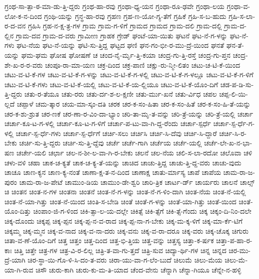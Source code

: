 {ಗ್ರಂಥ-ಸಾ-ತ್ಪಾ-ಠ-ಮಾ-ಡು-ತ್ತಿ-ದ್ದರು
ಗ್ರಂಥ-ಹಾ-ರವು
ಗ್ರಂಥಾ-ಧ್ಯ-ಯನ
ಗ್ರಂಥಾ-ರೂ-ಢವೇ
ಗ್ರಂಥಾ-ಲಯ
ಗ್ರಂಥಾ-ವ-ಲೋ-ಕ-ನ-ದಿಂದ
ಗ್ರಂಥಿ-ಯನ್ನು
ಗ್ರನ್ಥ-ಹಾ-ರವು
ಗ್ರಹಣ
ಗ್ರಹ-ಣ-ಯೋ-ಗ್ಯ-ತೆಗೆ
ಗ್ರಹಿಕೆ
ಗ್ರಹಿ-ಸ-ಬ-ಹುದು
ಗ್ರಹಿ-ಸ-ಲಾ-ರ-ದ-ವನ
ಗ್ರಹಿಸಿ
ಗ್ರಹ-ನ-ಕ್ಷ-ತ್ರ-ಗಳ
ಗ್ರಾಮ
ಗ್ರಾಮ-ಗ-ಳಿಗೆ
ಗ್ರಾಮದ
ಗ್ರಾಮದ
ಗ್ರಾಮ-ದಲಿ
ಗ್ರಾಮ-ದಲ್ಲಿ
ಗ್ರಾಮ-ದ-ಲ್ಲಿನ
ಗ್ರಾಮ-ದವ
ಗ್ರಾಮ-ದ-ವರು
ಗ್ರಾಮೀಣ
ಗ್ರಾಹಕ
ಗ್ರೇಡ್
ಘಂಟೆ-ಯಾ-ಯಿತು
ಘಟನೆ
ಘಟ-ನೆ-ಗ-ಳನ್ನು
ಘಟ-ನೆ-ಗಳು
ಘಟ-ನೆಯ
ಘಟ-ನೆ-ಯನ್ನು
ಘಟಿ-ಸು-ತ್ತಿದ್ದ
ಘಟ್ಟದ
ಘಣಿ
ಘನ-ಗಂ-ಭೀ-ರ-ಮು-ದ್ರೆ-ಯಿಂದ
ಘನತೆ
ಘನ-ತೆ-ಯನ್ನು
ಘಮ-ಘಮ
ಘೋಷ
ಘೋಷಣೆ
ಚ
ಚಂದ-ನೈ-ರ್ಮೃ-ತ್ತಿ-ಕಯಾ
ಚಂದ್ರ-ಗು-ತ್ತಿ-ರಸ್ತೆ
ಚಂದ್ರ-ಗು-ಪ್ತನ
ಚಂದ್ರ-ಶೇ-ಖ-ರ-ರ-ವರು
ಚಂಪೂ-ರಾ-ಮಾ-ಯಣ
ಚಕ್ರ-ದಿಂದ
ಚಕ್ರ-ಪಾಣಿ
ಚಕ್ಷು-ರು-ನ್ಮೀ-ಲಿತಂ
ಚಟು-ಚ-ಟಿ-ಕೆ-ಯಿಂದ
ಚಟು-ವ-ಟಿ-ಕೆ-ಗಳ
ಚಟು-ವ-ಟಿ-ಕೆ-ಗ-ಳನ್ನು
ಚಟು-ವ-ಟಿ-ಕೆ-ಗ-ಳಲ್ಲಿ
ಚಟು-ವ-ಟಿ-ಕೆ-ಗ-ಳಲ್ಲೂ
ಚಟು-ವ-ಟಿ-ಕೆ-ಗ-ಳಿಗೆ
ಚಟು-ವ-ಟಿ-ಕೆ-ಗಳು
ಚಟು-ವ-ಟಿ-ಕೆ-ಯಲ್ಲಿ
ಚಟು-ವ-ಟಿ-ಕೆ-ಯ-ಲ್ಲಿಯೂ
ಚಟು-ವ-ಟಿ-ಕೆ-ಯೊಂ-ದಿಗೆ
ಚಡ-ಪ-ಡಿ-ಸು-ತ್ತಿ-ದ್ದರು
ಚತು-ರ-ತೆಯೂ
ಚತು-ರರು
ಚತು-ರ್ದ-ಶ-ಲ-ಕ್ಷಣೀ
ಚತು-ರ್ಮು-ಖನೆ
ಚತು-ರ್ವಿಧ
ಚಪಲ
ಚಪ್ಪ-ಲಿ-ಯಿ-ಲ್ಲದೆ
ಚಪ್ಪಾಳೆ
ಚಮ-ತ್ಕಾರ
ಚಯ-ಮಾ-ಸ್ಕಂ-ದತಿ
ಚರಕ
ಚರ-ಕ-ಸಂ-ಹಿತಾ
ಚರ-ಕ-ಸಂ-ಹಿತೆ
ಚರ-ಕ-ಸಂ-ಹಿ-ತೆ-ಯನ್ನು
ಚರ-ಕ-ಶು-ಶ್ರುತ
ಚರ-ಣಕೆ
ಚರ-ಣಾ-ರ-ವಿಂ-ದಾ-ಭ್ಯಾಂ
ಚರಿ-ತಾ-ಮೃ-ತ-ವನ್ನು
ಚರಿ-ತ್ರೆ-ಯನ್ನು
ಚರಿ-ತ್ರೆ-ಯಲ್ಲಿ
ಚರ್ಚಾ
ಚರ್ಚಾ-ಕೂ-ಟ-ಗ-ಳಲ್ಲಿ
ಚರ್ಚಾ-ಕೂ-ಟ-ಗ-ಳಿಗೆ
ಚರ್ಚಾ-ಪ-ಟು-ವಾ-ಗಿ-ದ್ದ-ರೆಂದು
ಚರ್ಚಾ-ಸ್ಪರ್ಧೆ
ಚರ್ಚಾ-ಸ್ಪ-ರ್ಧೆ-ಗ-ಳಲ್ಲಿ
ಚರ್ಚಾ-ಸ್ಪ-ರ್ಧೆ-ಗಳು
ಚರ್ಚಾ-ಸ್ಪ-ರ್ಧೆಗೆ
ಚರ್ಚಿ-ಸಲು
ಚರ್ಚಿಸಿ
ಚರ್ಚಿ-ಸಿ-ದೆವು
ಚರ್ಚಿ-ಸಿ-ದ್ದಾರೆ
ಚರ್ಚಿ-ಸಿ-ರ-ಬೇಕು
ಚರ್ಚಿ-ಸು-ತ್ತಿ-ದ್ದರು
ಚರ್ಚಿ-ಸು-ತ್ತಿ-ದ್ದೆವು
ಚರ್ಚೆ
ಚರ್ಚೆ-ಗಾಗಿ
ಚರ್ಚೆಯ
ಚರ್ಚೆ-ಯಲ್ಲಿ
ಚರ್ಚೆ-ಲೇ-ಖ-ನ-ಭಾ-ಷಣ
ಚರ್ಚೇ-ಯಲಿ
ಚರ್ಛಾ
ಚಲ-ನ-ಶೀ-ಲ-ವಾ-ಗಿ-ರ-ಬೇಕು
ಚಲನೆ
ಚಲ-ನೆಯ
ಚಲಿ-ಸ-ಲಾ-ರದೋ
ಚಲೊವಾ
ಚಳಿ
ಚಳು-ವಳಿ
ಚಹಾ
ಚಾಕ-ಚ-ಕ್ಯತೆ
ಚಾಕ-ಚ-ಕ್ಯ-ತೆ-ಯನ್ನು
ಚಾಚಿದ
ಚಾಚು-ತ್ತಿದ್ದ
ಚಾಚು-ತ್ತಿ-ದ್ದ-ವರು
ಚಾಚು-ವುದು
ಚಾಚೂ
ಚಾಣ-ಕ್ಯನ
ಚಾಣ-ಕ್ಯ-ನಂತೆ
ಚಾಣಾ-ಕ್ಷ-ತ-ನ-ದಿಂದ
ಚಾಣಾಕ್ಷ
ಚಾತು-ರ್ಮಾಸ್ಯ
ಚಾಪೆ
ಚಾಪೆಯ
ಚಾಮ-ರಾ-ಜ-ಪುರಂ
ಚಾಮ-ರಾ-ಜ-ಪೇಟೆ
ಚಾಮುಂ-ಡಿಯ
ಚಾಮುಂ-ಡೇ-ಶ್ವರಿ
ಚಾರಿ-ತ್ರಿಕ
ಚಾರ್ಟ-ರ್ಡ್
ಚಾರ್ಯರು
ಚಾಲನೆ
ಚಾಲ್ಸ್
ಚಿ
ಚಿಂತನ
ಚಿಂತ-ನ-ಗಳ
ಚಿಂತನಾ
ಚಿಂತನೆ
ಚಿಂತ-ನೆ-ಗ-ಳನ್ನು
ಚಿಂತ-ನೆ-ಗ-ಳಿಂ-ದಾಗಿ
ಚಿಂತ-ನೆಯ
ಚಿಂತ-ನೆ-ಯಲ್ಲಿ
ಚಿಂತ-ನೆ-ಯಾ-ಗಿತ್ತು
ಚಿಂತ-ನೆ-ಯಿಂದ
ಚಿಂತಿ-ಸ-ಬೇಡಿ
ಚಿಂತೆ
ಚಿಂತೆ-ಗ-ಳನ್ನು
ಚಿಂತೆ-ಯಾ-ಗಿತ್ತು
ಚಿಂತೆ-ಯಿಂದ
ಚಿಂತೆ-ಯೊಂ-ದಿತ್ತು
ಚಿಂಪಾಂ-ಜಿ-ಗ-ಳಿಂದ
ಚಿಕಿ-ತ್ಸಾ-ಲ-ಯ-ದಲ್ಲೇ
ಚಿಕಿತ್ಸೆ
ಚಿಕಿ-ತ್ಸೆಗೆ
ಚಿಕಿ-ತ್ಸೆ-ಗೆಂದು
ಚಿಕ್ಕ
ಚಿಕ್ಕಂ-ದಿ-ನಿಂ-ದಲೇ
ಚಿಕ್ಕ-ದೊಂದು
ಚಿಕ್ಕಪ್ಪ
ಚಿಕ್ಕ-ಪ್ಪನ
ಚಿಕ್ಕ-ಪ್ಪ-ನ-ವ-ರಾದ
ಚಿಕ್ಕ-ಪ್ಪ-ನಾ-ಗ-ಬೇಕು
ಚಿಕ್ಕ-ಮ-ಕ್ಕ-ಳಿಗೆ
ಚಿಕ್ಕ-ಮಾ-ರ್ಕೆ-ಟಿಗೆ
ಚಿಕ್ಕಮ್ಮ
ಚಿಕ್ಕ-ಮ್ಮನ
ಚಿಕ್ಕ-ವ-ನಾದ
ಚಿಕ್ಕ-ವ-ನಾ-ದರು
ಚಿಕ್ಕ-ವನು
ಚಿಕ್ಕ-ವ-ರಾ-ದರೂ
ಚಿಕ್ಕ-ವರು
ಚಿಕ್ಕ-ಚೊಕ್ಕ
ಚಿಗುರು
ಚಿತಾ-ವ-ಣೆ-ಯೊಂ-ದಿಗೆ
ಚಿತ್ತ
ಚಿತ್ತಂ
ಚಿತ್ತ-ದಿಂದ
ಚಿತ್ತ-ಭಿ-ತ್ತಿಯ
ಚಿತ್ತ-ವನ್ನು
ಚಿತ್ತಸ್ಯ
ಚಿತ್ತಾ-ಕ-ರ್ಷಕ
ಚಿತ್ತಾ-ಪ-ಹಾ-ರ-ಕಾಃ
ಚಿತ್ತಿ
ಚಿತ್ತೇ
ಚಿತ್ರ-ಗಳ
ಚಿತ್ರ-ವಿ-ರ-ಲಿಲ್ಲ
ಚಿತ್ರಿ-ತ-ವಾ-ಗು-ತ್ತದೆ
ಚಿತ್ರಿ-ಸುವ
ಚಿದ್ಯಾ-ರ್ಥಿ-ಗಳ
ಚಿನ್ನ
ಚಿನ್ನದ
ಚಿರ-ಮು-ದ್ರೆ-ಯಾಗಿ
ಚಿರ-ಸ್ಥಾ-ಯಿ-ಗೊ-ಳಿ-ಸಿ-ದಂ-ತ-ವರು
ಚಿರಾ-ಯು-ವಾ-ಗ-ಲೆಂ-ಬುದೆ
ಚಿಲುಮೆ
ಚಿಲು-ಮೆಯ
ಚಿಲು-ಮೆ-ಯಾ-ಗಿ-ರುವ
ಚಿಸೌ
ಚುರು-ಕಾಗಿ
ಚುರು-ಕು-ಮ-ತಿ-ಯಾದ
ಚೆಂದ-ವೇನು
ಚೆನ್ನಾಗಿ
ಚೆನ್ನಾ-ಗಿಯೂ
ಚೆನ್ನೇ-ನ-ಹಳ್ಳಿ
}

